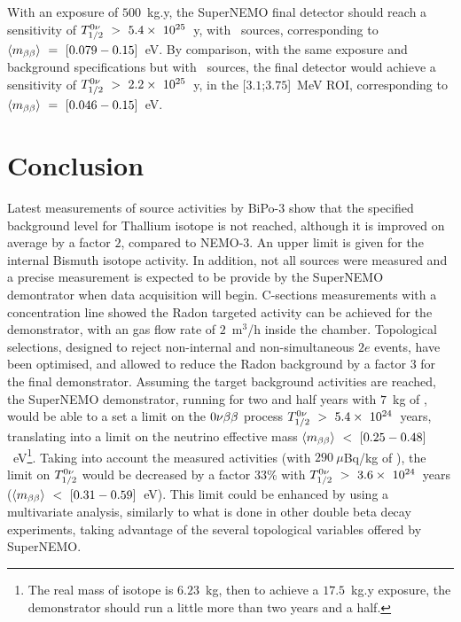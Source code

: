With an exposure of $500$~kg.y, the SuperNEMO final detector should reach a sensitivity of $T_{1/2}^{0\nu}~>~5.4\times~10^{25}$~y, with \Se\ sources, corresponding to $\langle m_{\beta\beta}\rangle~=~[0.079-0.15]$~eV.
By comparison, with the same exposure and background specifications but with \Nd\ sources, the final detector would achieve a sensitivity of $T_{1/2}^{0\nu}~>~2.2\times~10^{25}$~y, in the [$3.1$;$3.75$]~MeV ROI, corresponding to $\langle m_{\beta\beta}\rangle~=~[0.046-0.15]$~eV.


\section{Conclusion}

Latest measurements of source activities by BiPo-$3$ show that the specified background level for Thallium isotope is not reached, although it is improved on average by a factor $2$, compared to NEMO-$3$.
An upper limit is given for the internal Bismuth isotope activity.
In addition, not all sources were measured and a precise measurement is expected to be provide by the SuperNEMO demontrator when data acquisition will begin.
C-sections measurements with a concentration line showed the Radon targeted activity can be achieved for the demonstrator, with an gas flow rate of $2$~m$^{3}$/h inside the chamber.
Topological selections, designed to reject non-internal and non-simultaneous $2e$ events, have been optimised, and allowed to reduce the Radon background by a factor $3$ for the final demonstrator.
Assuming the target background activities are reached, the SuperNEMO demonstrator, running for two and half years with $7$~kg of \Se, would be able to a set a limit on the $0\nu\beta\beta$ process $T_{1/2}^{0\nu}~>~5.4\times~10^{24}$~years, translating into a limit on the neutrino effective mass $\langle m_{\beta\beta}\rangle~<~[0.25-0.48]$~eV\footnote{The real mass of isotope is $6.23$~kg, then to achieve a $17.5$~kg.y exposure, the demonstrator should run a little more than two years and a half.}.
Taking into account the measured activities (with $290~\mu$Bq/kg of \Bi), the limit on $T_{1/2}^{0\nu}$ would be decreased by a factor $33$\% with $T_{1/2}^{0\nu}~>~3.6\times~10^{24}$~years ($\langle m_{\beta\beta}\rangle~<~[0.31-0.59]$~eV).
This limit could be enhanced by using a multivariate analysis, similarly to what is done in other double beta decay experiments, taking advantage of the several topological variables offered by SuperNEMO.

